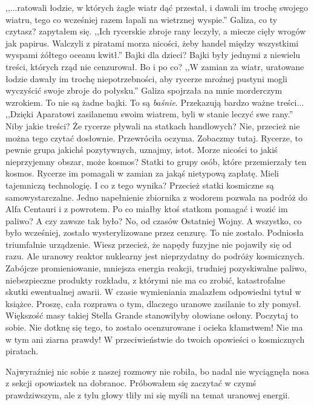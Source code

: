 \begin{dialogue}
	\ds{} ,,...ratowali łodzie, w których żagle wiatr dąć przestał, i dawali im trochę swojego wiatru, tego co wcześniej razem łapali na wietrznej wyspie.''
	\ds{} Galiza, co ty czytasz? \dm{} zapytałem się.
	\ds{} ,,Ich rycerskie zbroje rany leczyły, a miecze cięły wrogów jak papirus. Walczyli z piratami morza nicości, żeby handel między wszystkimi wyspami żółtego oceanu kwitł.''
	\ds{} Bajki dla dzieci? \dm{} Bajki były jednymi z niewielu treści, których rząd nie cenzurował. Bo i po co?
	\ds{} ,,W zamian za wiatr, uratowane łodzie dawały im trochę niepotrzebności, aby rycerze mroźnej pustyni mogli wyczyścić swoje zbroje do połysku.'' \dm{} Galiza spojrzała na mnie morderczym wzrokiem. \dm{} To nie są żadne bajki. To są \emph{baśnie}. Przekazują bardzo ważne treści... ,,Dzięki Aparatowi zasilanemu swoim wiatrem, byli w stanie leczyć swe rany.''
	\ds{} Niby jakie treści? Że rycerze pływali na statkach handlowych?
	\ds{} Nie, przecież nie można tego czytać dosłownie. \dm{} Przewróciła oczyma. \dm{} Zobaczmy tutaj. Rycerze, to pewnie grupa jakichś pozytywnych, uznajmy, istot. Morze nicości to jakiś nieprzyjemny obszar, może kosmos? Statki to grupy osób, które przemierzały ten kosmos. Rycerze im pomagali w zamian za jakąś nietypową zapłatę. Mieli tajemniczą technologię.
	\ds{} I co z tego wynika? Przecież statki kosmiczne są samowystarczalne. Jedno napełnienie zbiornika z wodorem pozwala na podróż do Alfa Centauri i z powrotem. Po co miałby ktoś statkom pomagać i wozić im paliwo?
	\ds{} A czy zawsze tak było?
	\ds{} No, od czasów Ostatniej Wojny. A wszystko, co było wcześniej, zostało wysterylizowane przez cenzurę.
	\ds{} To nie zostało. \dm{} Podniosła triumfalnie urządzenie. \dm{} Wiesz przecież, że napędy fuzyjne nie pojawiły się od razu.
	\ds{} Ale uranowy reaktor nuklearny jest nieprzydatny do podróży kosmicznych. Zabójcze promieniowanie, mniejsza energia reakcji, trudniej pozyskiwalne paliwo, niebezpieczne produkty rozkładu, z którymi nie ma co zrobić, katastrofalne skutki ewentualnej awarii. \dm{} W czasie wymieniania znalazłem odpowiedni tytuł w książce. \dm{} Proszę, cała rozprawa o tym, dlaczego uranowe zasilanie to zły pomysł. Większość masy takiej Stella Grande stanowiłyby ołowiane osłony. Poczytaj to sobie.
	\ds{} Nie dotknę się tego, to zostało ocenzurowane i ocieka kłamstwem! Nie ma w tym ani ziarna prawdy!
	\ds{} W przeciwieństwie do twoich opowieści o kosmicznych piratach.
\end{dialogue}

Najwyraźniej nic sobie z naszej rozmowy nie robiła, bo nadal nie wyciągnęła nosa z sekcji opowiastek na dobranoc.
Próbowałem się zaczytać w czymś prawdziwszym, ale z tylu głowy tliły mi się myśli na temat uranowej energii.

